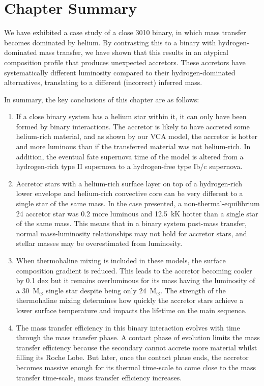 \section{Chapter Summary}

We have exhibited a case study of a close \SI[parse-numbers=false]{30+10}{\msun} binary, in which mass transfer becomes dominated by helium. By contrasting this to a binary with hydrogen-dominated mass transfer, we have shown that this results in an atypical composition profile that produces unexpected accretors. These accretors have systematically different luminosity compared to their hydrogen-dominated alternatives, translating to a different (incorrect) inferred mass.

In summary, the key conclusions of this chapter are as follows:


\begin{enumerate}
    \item If a close binary system has a helium star within it, it can only have been formed by binary interactions. The accretor is likely to have accreted some helium-rich material, and as shown by our VCA model, the accretor is hotter and more luminous than if the transferred material was not helium-rich. In addition, the eventual fate supernova time of the model is altered from a hydrogen-rich type II supernova to a hydrogen-free type Ib/c supernova.
    \item Accretor stars with a helium-rich surface layer on top of a hydrogen-rich lower envelope and helium-rich convective core can be very different to a single star of the same mass. In the case presented, a non-thermal-equilibrium \SI{24}{\msun} accretor star was \SI{0.2}{\dex} more luminous and \SI{12.5}{\kilo\kelvin} hotter than a single star of the same mass. This means that in a binary system post-mass transfer, normal mass-luminosity relationships may not hold for accretor stars, and stellar masses may be overestimated from luminosity.
    \item When thermohaline mixing is included in these models, the surface composition gradient is reduced. This leads to the accretor becoming cooler by 0.1 dex but it remains overluminous for its mass having the luminosity of a 30~M$_{\odot}$ single star despite being only 24~M$_{\odot}$. The strength of the thermohaline mixing determines how quickly the accretor stars achieve a lower surface temperature and impacts the lifetime on the main sequence.
    \item The mass transfer efficiency in this binary interaction evolves with time through the mass transfer phase. A contact phase of evolution limits the mass transfer efficiency because the secondary cannot accrete more material whilst filling its Roche Lobe. But later, once the contact phase ends, the accretor becomes massive enough for its thermal time-scale to come close to the mass transfer time-scale, mass transfer efficiency increases.

\end{enumerate}
